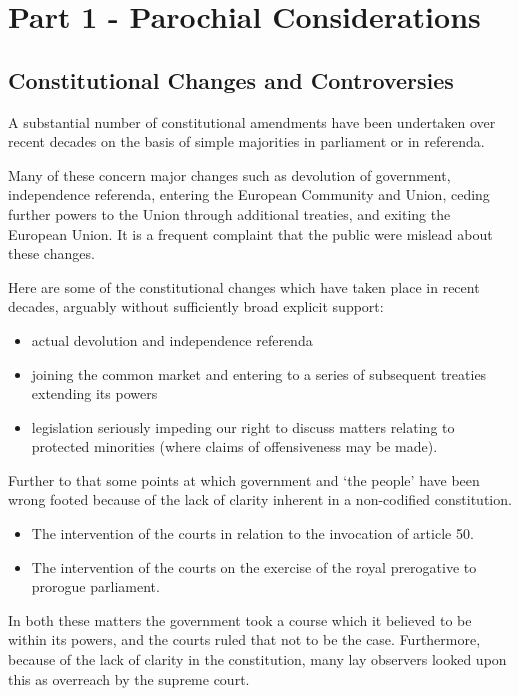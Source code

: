 \documentclass[14pt,titlepage]{extarticle}
\begin{document}
\section{Part 1 - Parochial Considerations}

\subsection{Constitutional Changes and Controversies}

A substantial number of constitutional amendments have been undertaken over recent decades on the basis of simple majorities in parliament or in referenda.

Many of these concern major changes such as devolution of government, independence referenda, entering the European Community and Union, ceding further powers to the Union through additional treaties, and exiting the European Union.
It is a frequent complaint that the public were mislead about these changes.

Here are some of the constitutional changes which have taken place in recent decades, arguably without sufficiently broad explicit support:

\begin{itemize}
\item actual devolution and independence referenda
\item joining the common market and entering to a series of subsequent treaties extending its powers
  \item legislation seriously impeding our right to discuss matters relating to protected minorities (where claims of offensiveness may be made).
  \end{itemize}

Further to that some points at which government and `the people' have been wrong footed because of the lack of clarity inherent in a non-codified constitution.

\begin{itemize}
\item The intervention of the courts in relation to the invocation of article 50.
\item The intervention of the courts on the exercise of the royal prerogative to prorogue parliament.
\end{itemize}

In both these matters the government took a course which it believed to be within its powers, and the courts ruled that not to be the case.
Furthermore, because of the lack of clarity in the constitution, many lay observers looked upon this as overreach by the supreme court.
\end{document}
